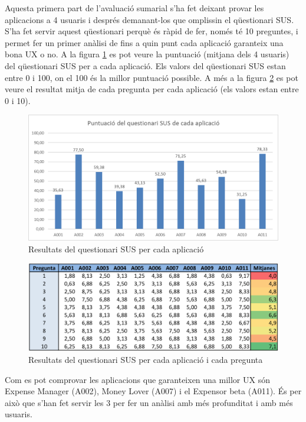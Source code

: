 Aquesta primera part de l'avaluació sumarial s'ha fet deixant provar les aplicacions a 4 usuaris i després demanant-los que omplissin el qüestionari SUS. S'ha fet servir aquest qüestionari perquè és ràpid de fer, només té 10 preguntes, i permet fer un primer anàlisi de fins a quin punt cada aplicació garanteix una bona \ac{UX} o no. A la figura \ref{fig:SUS_analisi} es pot veure la puntuació (mitjana dels 4 usuaris) del qüestionari SUS per a cada aplicació. Els valors del qüestionari SUS estan entre 0 i 100, on el 100 és la millor puntuació possible. A més a la figura \ref{fig:SUS_table} es pot veure el resultat mitja de cada pregunta per cada aplicació (els valors estan entre 0 i 10).

\begin{figure}[htp]
\centering
\includegraphics[scale=0.8]{SUS_analisi_1.png}
\caption{Resultats del questionari SUS per cada aplicació}\label{fig:SUS_analisi}
\end{figure}

\begin{figure}[htp]
\centering
\includegraphics[scale=0.9]{SUS_table_2.png}
\caption{Resultats del questionari SUS per cada aplicació i cada pregunta}\label{fig:SUS_table}
\end{figure}

Com es pot comprovar les aplicacions que garanteixen una millor \ac{UX} són Expense Manager (A002), Money Lover (A007) i el Expensor beta (A011). És per això que s'han fet servir les 3 per fer un anàlisi amb més profunditat i amb més usuaris.

